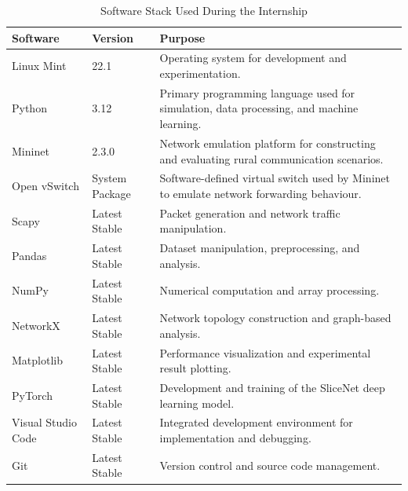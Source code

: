 \documentclass[12pt,a4paper]{report}
\begin{document}
	\begin{table}[H]
		\centering
		\caption{Software Stack Used During the Internship}
		\label{tab:software}
		
		\begin{tabular}{|p{3.5cm}|p{3cm}|p{8cm}|}
			\hline
			
			\textbf{Software} &
			\textbf{Version} &
			\textbf{Purpose}
			\\
			\hline
			
			Linux Mint &
			22.1 &
			Operating system for development and experimentation.
			\\
			\hline
			
			Python &
			3.12 &
			Primary programming language used for simulation, data processing, and machine learning.
			\\
			\hline
			
			Mininet &
			2.3.0 &
			Network emulation platform for constructing and evaluating rural communication scenarios.
			\\
			\hline
			
			Open vSwitch &
			System Package &
			Software-defined virtual switch used by Mininet to emulate network forwarding behaviour.
			\\
			\hline
			
			Scapy &
			Latest Stable &
			Packet generation and network traffic manipulation.
			\\
			\hline
			
			Pandas &
			Latest Stable &
			Dataset manipulation, preprocessing, and analysis.
			\\
			\hline
			
			NumPy &
			Latest Stable &
			Numerical computation and array processing.
			\\
			\hline
			
			NetworkX &
			Latest Stable &
			Network topology construction and graph-based analysis.
			\\
			\hline
			
			Matplotlib &
			Latest Stable &
			Performance visualization and experimental result plotting.
			\\
			\hline
			
			PyTorch &
			Latest Stable &
			Development and training of the SliceNet deep learning model.
			\\
			\hline
			
			Visual Studio Code &
			Latest Stable &
			Integrated development environment for implementation and debugging.
			\\
			\hline
			
			Git &
			Latest Stable &
			Version control and source code management.
			\\
			\hline
			
		\end{tabular}
		
	\end{table}
	
\end{document}
